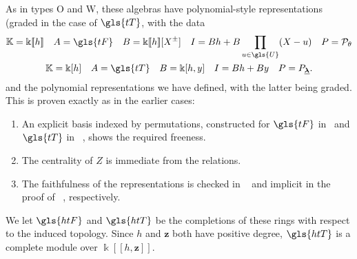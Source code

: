 \documentclass[ALCO,ThmDefs,Unicode,epreuves]{cedram}
\newcommand{\Bz}{\mathbf{z}}
\newcommand{\K}{\Bbbk}%
\newcommand{\la}{\lambda}
\newcommand{\cP}{\mathcal{P}}
\newcommand{\bla}{{\underline{\boldsymbol{\la}}}}
\newcommand\llbracket{[\![}
\newcommand\rrbracket{]\!]}
\begin{document}
As in types O and W, these algebras have polynomial-style
representations (graded in the case of $\gls{tT}$, with the data
\begin{gather*}%
\mathbb{K}=\K\llbracket h\rrbracket \quad A=\gls{tF}\quad
 B=\K\llbracket h\rrbracket [X^{\pm}]\quad I=Bh+B\prod_{u\in \gls{U}}(X-u)\quad P=\cP_{\theta}%
\\
\mathbb{K}=\K[h]\quad A=\gls{tT} \quad
 B=\K[h,y]\quad I=Bh+By \quad P=P_{\bla}.%
\end{gather*}
and the polynomial representations we have defined, with the latter
being graded. This is proven exactly as in the earlier cases:
\begin{enumerate}
\item An explicit basis indexed by permutations, constructed for
 $\gls{tF}$ in~\cite[Prop.~1.15]{MS18} and $\gls{tT} $ in
~\cite[Prop.~4.16]{Webmerged}, shows the required freeness.
 \item The
 centrality of $Z$ is immediate from the relations.
 \item The
 faithfulness of the representations is checked in
~\cite[Prop.~1.11]{MS18} and implicit in the proof of
~\cite[Prop.~4.16]{Webmerged}, respectively.
\end{enumerate}



 We let $\gls{htF}$ and 
 $\gls{htT}$ be the completions of these rings with respect to the
 induced topology. Since $h$ and $\Bz$ both have positive
 degree, $\gls{htT}$ is a complete module over $\K\llbracket h,\Bz\rrbracket $.
\end{document}
